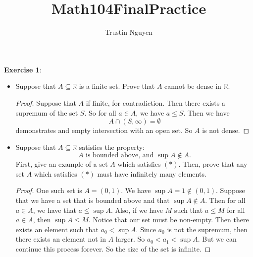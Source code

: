 \documentclass{article}
\title{Math104FinalPractice}
\author{Trustin Nguyen}
\begin{document}
    \maketitle

\reversemarginpar

\textbf{Exercise 1}: \begin{itemize}
    \item Suppose that $A \subseteq \mathbb{R}$ is a finite set. Prove that $A$ cannot be dense in $\mathbb{R}$.
        \begin{proof}
            Suppose that $A$ if finite, for contradiction. Then there exists a supremum of the set $S$. So for all $a \in A$, we have $a \leq S$. Then we have
                \begin{equation*}
                    A \cap (S, \infty) = \emptyset
                \end{equation*}
            demonstrates and empty intersection with an open set. So $A$ is not dense. 
        \end{proof}

    \item Suppose that $A \subseteq \mathbb{R}$ satisfies the property:
        \begin{equation*}
            A \text{ is bounded above, and $\sup A  \notin A$.}
        \end{equation*}
    First, give an example of a set $A$ which satisfies $(*)$. Then, prove that any set $A$ which satisfies $(*)$ must have infinitely many elements.
        \begin{proof}
            One such set is $A = (0, 1)$. We have $\sup A = 1 \notin (0, 1)$. Suppose that we have a set that is bounded above and that $\sup A \notin A$. Then for all $a \in A$, we have that $a \leq \sup A$. Also, if we have $M$ such that $a \leq M$ for all $a \in A$, then $\sup A \leq M$. Notice that our set must be non-empty. Then there exists an element such that $a_{0} < \sup A$. Since $a_{0}$ is not the supremum, then there exists an element not in $A$ larger. So $a_{0} < a_{1} < \sup A$. But we can continue this process forever. So the size of the set is infinite.
        \end{proof}
\end{itemize}
\end{document}
